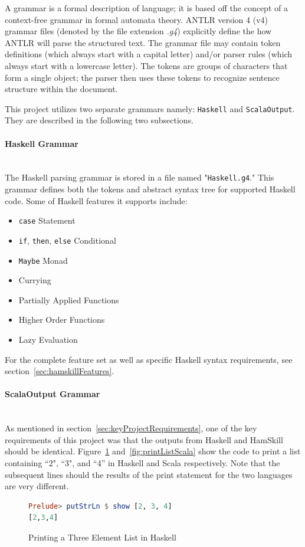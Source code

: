 \documentclass{report}
\newcommand{\myparagraph}[1]{\paragraph{#1}\mbox{}\\}
\begin{document}
A grammar is a formal description of language; it is based off the concept of a context-free grammar in formal automata theory.  ANTLR version 4 (v4) grammar files (denoted by the file extension \emph{.g4}) explicitly define the how ANTLR will parse the structured text.  The grammar file may contain token definitions (which always start with a capital letter) and/or parser rules (which always start with a lowercase letter).  The tokens are groups of characters that form a single object; the parser then uses these tokens to recognize sentence structure within the document.

This project utilizes two separate grammars namely: \texttt{Haskell} and \texttt{ScalaOutput}.  They are described in the following two subsections.

\myparagraph{Haskell Grammar} 

The Haskell parsing grammar is stored in a file named "\texttt{Haskell.g4}."  This grammar defines both the tokens and abstract syntax tree for supported Haskell code.  Some of Haskell features it supports include:

\begin{itemize}
   \item \texttt{case} Statement
   \item \texttt{if}, \texttt{then}, \texttt{else} Conditional
   \item \texttt{Maybe} Monad
   \item Currying
   \item Partially Applied Functions
   \item Higher Order Functions
   \item Lazy Evaluation
\end{itemize}

For the complete feature set as well as specific Haskell syntax requirements, see section~\ref{sec:hamskillFeatures}.

\myparagraph{ScalaOutput Grammar} 

As mentioned in section~\ref{sec:keyProjectRequirements}, one of the key requirements of this project was that the outputs from Haskell and HamSkill should be identical.  Figure~\ref{fig:printListHaskell} and~\ref{fig:printListScala} show the code to print a list containing ``2", ``3", and ``4'' in Haskell and Scala respectively.  Note that the subsequent lines should the results of the print statement for the two languages are very different.

\begin{figure}[H]
\begin{mdframed}
\begin{lstlisting}[language=Haskell]
Prelude> putStrLn $ show [2, 3, 4]
[2,3,4]
\end{lstlisting}
\end{mdframed}
\caption{Printing a Three Element List in Haskell}\label{fig:printListHaskell}
\end{figure}
\end{document}
